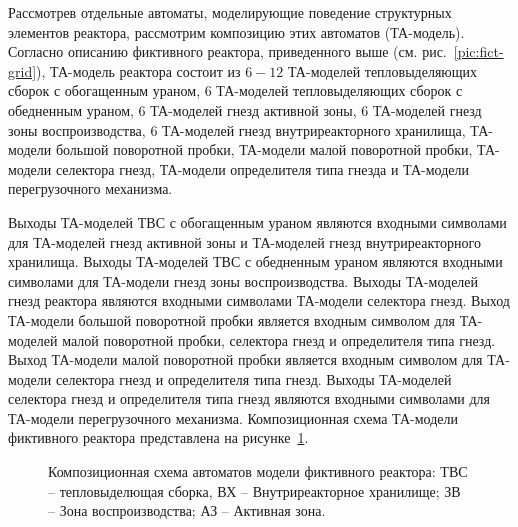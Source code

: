 Рассмотрев отдельные автоматы, моделирующие поведение структурных элементов реактора, рассмотрим композицию этих автоматов (ТА-модель).
Согласно описанию фиктивного реактора, приведенного выше (см. рис.~\ref{pic:fict-grid}), ТА-модель реактора состоит из $6-12$ ТА-моделей тепловыделяющих сборок с обогащенным ураном, $6$ ТА-моделей тепловыделяющих сборок с обедненным ураном, $6$ ТА-моделей гнезд активной зоны, $6$ ТА-моделей гнезд зоны воспроизводства, $6$ ТА-моделей гнезд внутриреакторного хранилища, ТА-модели большой поворотной пробки, ТА-модели малой поворотной пробки, ТА-модели селектора гнезд, ТА-модели определителя типа гнезда и ТА-модели перегрузочного механизма.    

Выходы ТА-моделей ТВС с обогащенным ураном являются входными символами для ТА-моделей гнезд активной зоны и ТА-моделей гнезд внутриреакторного хранилища. 
Выходы ТА-моделей ТВС с обедненным ураном являются входными символами для ТА-модели гнезд зоны воспроизводства. 
Выходы ТА-моделей гнезд реактора являются входными символами ТА-модели селектора гнезд. 
Выход ТА-модели большой поворотной пробки является входным символом для ТА-моделей малой поворотной пробки, селектора гнезд и определителя типа гнезд.
Выход ТА-модели малой поворотной пробки является входным символом для ТА-модели селектора гнезд и определителя типа гнезд.
Выходы ТА-моделей селектора гнезд и определителя типа гнезд являются входными символами для ТА-модели перегрузочного механизма.
Композиционная схема ТА-модели фиктивного реактора представлена на рисунке~\ref{pic:fict-composition}.

\begin{figure}[ht]
\caption[Композиционная схема автоматов модели фиктивного реактора]{Композиционная схема автоматов модели фиктивного реактора: ТВС -- тепловыделющая сборка, ВХ -- Внутриреакторное хранилище; ЗВ -- Зона воспроизводства; АЗ -- Активная зона.}
\label{pic:fict-composition}
\end{figure}


